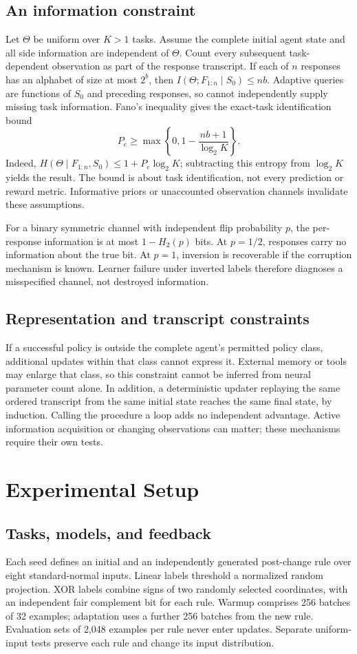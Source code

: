 \documentclass[11pt]{article}
\begin{document}
\subsection{An information constraint}
Let $\Theta$ be uniform over $K>1$ tasks. Assume the complete initial agent
state and all side information are independent of $\Theta$. Count every
subsequent task-dependent observation as part of the response transcript.
If each of $n$ responses has an alphabet of size at most $2^b$, then
$I(\Theta;F_{1:n}\mid S_0)\leq nb$. Adaptive queries are functions of
$S_0$ and preceding responses, so cannot independently supply missing task
information. Fano's inequality gives the exact-task identification bound
\[
 P_e\geq \max\left\{0,1-\frac{nb+1}{\log_2 K}\right\}.
\]
Indeed, $H(\Theta\mid F_{1:n},S_0)\leq 1+P_e\log_2 K$; subtracting
this entropy from $\log_2 K$ yields the result. The bound is about task
identification, not every prediction or reward metric. Informative priors or
unaccounted observation channels invalidate these assumptions.

For a binary symmetric channel with independent flip probability $p$, the
per-response information is at most $1-H_2(p)$ bits. At $p=1/2$, responses
carry no information about the true bit. At $p=1$, inversion is recoverable
if the corruption mechanism is known. Learner failure under inverted labels
therefore diagnoses a misspecified channel, not destroyed information.

\subsection{Representation and transcript constraints}
If a successful policy is outside the complete agent's permitted policy class,
additional updates within that class cannot express it. External memory or
tools may enlarge that class, so this constraint cannot be inferred from
neural parameter count alone. In addition, a deterministic updater replaying
the same ordered transcript from the same initial state reaches the same
final state, by induction. Calling the procedure a loop adds no independent
advantage. Active information acquisition or changing observations can matter;
these mechanisms require their own tests.

\section{Experimental Setup}
\subsection{Tasks, models, and feedback}
Each seed defines an initial and an independently generated post-change rule
over eight standard-normal inputs. Linear labels threshold a normalized random
projection. XOR labels combine signs of two randomly selected coordinates,
with an independent fair complement bit for each rule. Warmup comprises 256
batches of 32 examples; adaptation uses a further 256 batches from the new
rule. Evaluation sets of 2,048 examples per rule never enter updates. Separate
uniform-input tests preserve each rule and change its input distribution.
\end{document}
